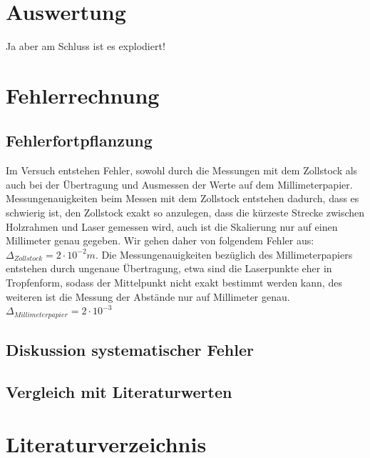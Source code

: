 \documentclass[12pt,a4paper,titlepage,headinclude,bibtotoc]{scrartcl}
\begin{document}
\section{Auswertung}

Ja aber am Schluss ist es explodiert!

\section{Fehlerrechnung}
\subsection{Fehlerfortpflanzung}
Im Versuch entstehen Fehler, sowohl durch die Messungen mit dem Zollstock als auch bei der Übertragung und Ausmessen der Werte auf dem Millimeterpapier. Messungenauigkeiten beim Messen mit dem Zollstock entstehen dadurch, dass es schwierig ist, den Zollstock exakt so anzulegen, dass die kürzeste Strecke zwischen Holzrahmen und Laser gemessen wird, auch ist die Skalierung nur auf einen Millimeter genau gegeben. Wir gehen daher von folgendem Fehler aus: $\Delta_{Zollstock}={2} \cdot{10^{-2}}m$. Die Messungenauigkeiten bezüglich des Millimeterpapiers entstehen durch ungenaue Übertragung, etwa sind die Laserpunkte eher in Tropfenform, sodass der Mittelpunkt nicht exakt bestimmt werden kann, des weiteren ist die Messung der Abstände nur auf Millimeter genau. $\Delta_{Millimeterpapier}={2} \cdot {10^{-3}}$    

\subsection{Diskussion systematischer Fehler}



\subsection{Vergleich mit Literaturwerten}

\section{Literaturverzeichnis}


\end{document}
